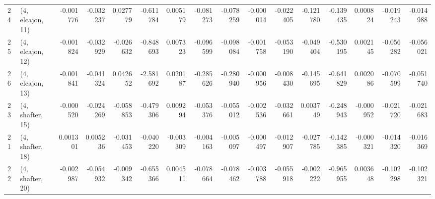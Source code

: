 \begin{tabular}{llrrrrrrrrrrrrrr}
24 &  (4, elcajon, 11) &  -0.001776 & -0.032237 &  0.027779 &  -0.611784 &  0.005179 &  -0.081273 & -0.078259 & -0.000014 & -0.022405 & -0.121780 &  -0.139435 &  0.000824 & -0.019243 & -0.014988 \\
25 &  (4, elcajon, 12) &  -0.001824 & -0.032929 & -0.026632 &  -0.848693 &  0.007323 &  -0.096599 & -0.098084 & -0.001758 & -0.053190 & -0.049404 &  -0.530195 &  0.002145 & -0.056282 & -0.056021 \\
26 &  (4, elcajon, 13) &  -0.001841 & -0.041324 &  0.042652 &  -2.581692 &  0.020187 &  -0.285626 & -0.280940 & -0.000956 & -0.008430 & -0.145695 &  -0.641829 &  0.002086 & -0.070599 & -0.051740 \\
23 &  (4, shafter, 15) &  -0.000520 & -0.024269 & -0.058853 &  -0.479306 &  0.009294 &  -0.053376 & -0.055012 & -0.002536 & -0.032661 &  0.003749 &  -0.248943 & -0.000952 & -0.021720 & -0.021683 \\
21 &  (4, shafter, 18) &   0.001301 &  0.005236 & -0.031453 &  -0.040220 & -0.003309 &  -0.004163 & -0.005097 & -0.000497 & -0.012907 & -0.027785 &  -0.142385 & -0.000321 & -0.014320 & -0.016369 \\
22 &  (4, shafter, 20) &  -0.002987 & -0.054932 & -0.009342 &  -0.655366 &  0.004511 &  -0.078664 & -0.078462 & -0.003788 & -0.055918 & -0.002222 &  -0.965955 &  0.003648 & -0.102298 & -0.102321 \\
\bottomrule
\end{tabular}

